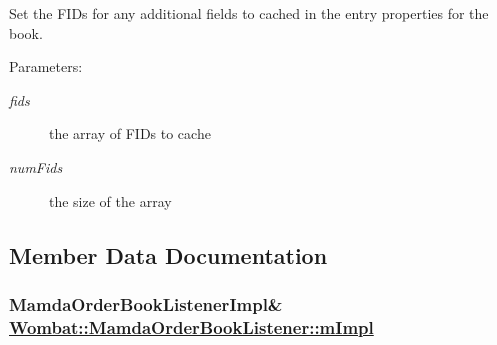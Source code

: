 Set the FIDs for any additional fields to cached in the entry properties for the book. 

\begin{Desc}
\item[Parameters:]
\begin{description}
\item[{\em fids}]the array of FIDs to cache \item[{\em num\-Fids}]the size of the array \end{description}
\end{Desc}


\subsection{Member Data Documentation}
\hypertarget{classWombat_1_1MamdaOrderBookListener_ace34a93d0a027b656d45d68bbf9748d}{
\subsubsection[mImpl]{\setlength{\rightskip}{0pt plus 5cm}Mamda\-Order\-Book\-Listener\-Impl\& \hyperlink{classWombat_1_1MamdaOrderBookListener_ace34a93d0a027b656d45d68bbf9748d}{Wombat::Mamda\-Order\-Book\-Listener::m\-Impl}}}
\label{classWombat_1_1MamdaOrderBookListener_ace34a93d0a027b656d45d68bbf9748d}


